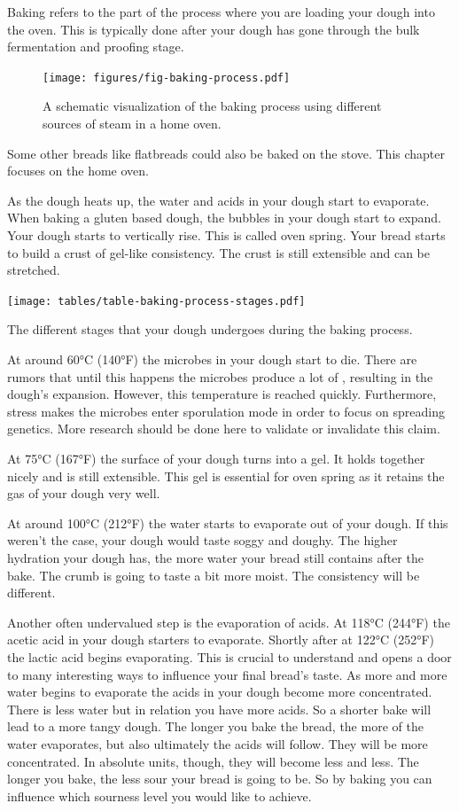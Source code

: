 Baking refers to the part of the process where you are loading
your dough into the oven. This is typically done after your
dough has gone through the bulk fermentation and proofing stage.

\begin{figure}[!htb]
  \texttt{[image: figures/fig-baking-process.pdf]}
  \caption{A schematic visualization of the baking process using different sources of steam in a home oven.}
  \label{fig:baking-process}
\end{figure}

Some other breads like flatbreads
could also be baked on the stove. This chapter focuses on the
home oven.

As the dough heats up, the water and acids
in your dough start to evaporate. When baking
a gluten based dough, the bubbles in your dough start to expand.
Your dough starts to vertically rise. This is called oven spring.
Your bread starts to build a crust of gel-like consistency. The crust is still
extensible and can be stretched.

\begin{table}[htp!]
  \texttt{[image: tables/table-baking-process-stages.pdf]}
  \caption{The different stages that your dough undergoes during the baking process.}
\end{table}

At around 60°C (140°F) the microbes in your dough start to die.
There are rumors that until this happens the microbes produce
a lot of , resulting in the dough's expansion. However, this temperature
is reached quickly. Furthermore, stress makes the microbes
enter sporulation mode in order to focus on spreading genetics.
More research should be done here to validate or invalidate this
claim.

At 75°C (167°F) the surface of your dough turns into a gel. It
holds together nicely and is still extensible. This gel is essential
for oven spring as it retains the gas of your dough very well.

At around 100°C (212°F) the water starts to evaporate out of your
dough. If this weren't the case, your dough would taste soggy and
doughy. The higher hydration your dough has, the more water your bread
still contains after the bake. The crumb is going to taste a bit
more moist. The consistency will be different.

Another often undervalued step is the evaporation of acids. At
118°C (244°F) the acetic acid in your dough starters to evaporate.
Shortly after at 122°C (252°F) the lactic acid begins evaporating.
This is crucial to understand and opens a door to many interesting
ways to influence your final bread's taste. As more and more water
begins to evaporate the acids in your dough become more concentrated.
There is less water but in relation you have more acids. So a shorter
bake will lead to a more tangy dough. The longer you bake the bread,
the more of the water evaporates, but also ultimately the acids will follow.
They will be more concentrated. In absolute units, though, they
will become less and less. The longer you bake, the less sour
your bread is going to be. So by baking you can
influence which sourness level you would like to achieve.

